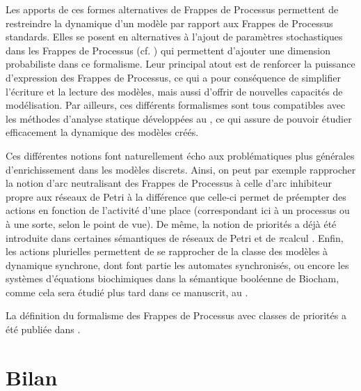 Les apports de ces formes alternatives de Frappes de Processus permettent de restreindre
la dynamique
d'un modèle par rapport aux Frappes de Processus standards.
Elles se posent en alternatives à l'ajout de paramètres stochastiques dans les Frappes de Processus
(cf. )
qui permettent d'ajouter une dimension probabiliste dans ce formalisme.
Leur principal atout est de renforcer la puissance d'expression des Frappes de Processus,
ce qui a pour conséquence de simplifier l'écriture et la lecture des modèles,
mais aussi d'offrir de nouvelles capacités de modélisation.
Par ailleurs,
ces différents formalismes sont tous compatibles avec les méthodes d'analyse statique
développées au ,
ce qui assure de pouvoir étudier efficacement la dynamique des modèles créés.

Ces différentes notions font naturellement écho aux problématiques plus générales d'enrichissement
dans les modèles discrets.
Ainsi, on peut par exemple rapprocher la notion d'arc neutralisant des Frappes de Processus
à celle d'arc inhibiteur propre aux réseaux de Petri \cite{Peterson77petrinets}
à la différence que celle-ci permet de préempter des actions en fonction de l'activité
d'une place (correspondant ici à un processus ou à une sorte, selon le point de vue).
De même, la notion de priorités a déjà été introduite dans certaines sémantiques de réseaux
de Petri \cite{Marsan87} et de $\pi$\nbd calcul \cite{jlnu2010}.
Enfin, les actions plurielles permettent de se rapprocher de la classe des modèles
à dynamique synchrone,
dont font partie les automates synchronisés,
ou encore les systèmes d'équations biochimiques dans la sémantique booléenne de Biocham,
comme cela sera étudié plus tard dans ce manuscrit, au .

\myskip

La définition du formalisme des Frappes de Processus avec classes de priorités
a été publiée dans \cite*{FPMR13-CS2Bio}.











\section{Bilan}

